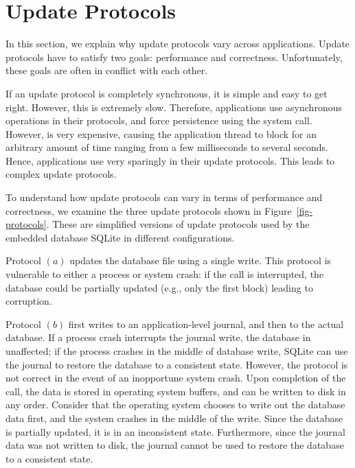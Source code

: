 \section{Update Protocols}
\label{sec-protocols}

In this section, we explain why update protocols vary across
applications. Update protocols have to satisfy two goals: performance and
correctness.  Unfortunately, these goals are often in conflict with each
other. 

If an update protocol is completely synchronous, it is simple and easy to get
right. However, this is extremely slow. Therefore, applications use
asynchronous operations in their protocols, and force persistence using the
 system call. However,  is very expensive,
causing the application thread to block for an arbitrary amount of time
ranging from a few milliseconds to several seconds. Hence, applications use
 very sparingly in their update protocols. This leads to
complex update protocols.


To understand how update protocols can vary in terms of performance and
correctness, we examine the three update protocols shown in
Figure~\ref{fig-protocols}. These are simplified versions of update protocols
used by the embedded database SQLite in different configurations.

Protocol $(a)$ updates the database file using a single write. This protocol is
vulnerable to either a process or system crash: if the  call
is interrupted, the database could be partially updated (e.g., only the first
block) leading to corruption.   

Protocol $(b)$ first writes to an application-level journal, and then to the
actual database. If a process crash interrupts the journal write, the database
in unaffected; if the process crashes in the middle of database write, SQLite
can use the journal to restore the database to a consistent state. However,
the protocol is not correct in the event of an inopportune system crash. Upon
completion of the  call, the data is stored in operating
system buffers, and can be written to disk in any order. Consider that the
operating system chooses to write out the database data first, and the system
crashes in the middle of the write. Since the database is partially updated, it
is in an inconsistent state. Furthermore, since the journal data was not
written to disk, the journal cannot be used to restore the database to a
consistent state.

